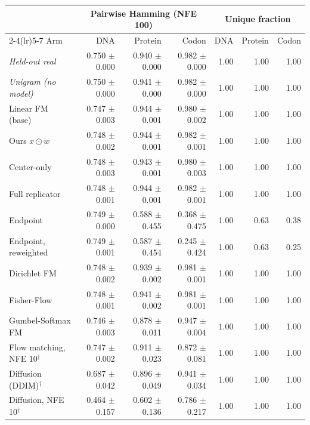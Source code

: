 \begin{tabular}{lrrrrrr}
\toprule
& \multicolumn{3}{c}{Pairwise Hamming (NFE 100)} & \multicolumn{3}{c}{Unique fraction} \\
\cmidrule(lr){2-4}\cmidrule(lr){5-7}
Arm & DNA & Protein & Codon & DNA & Protein & Codon \\
\midrule
\emph{Held-out real} & 0.750 $\pm$ 0.000 & 0.940 $\pm$ 0.000 & 0.982 $\pm$ 0.000 & 1.00 & 1.00 & 1.00 \\
\emph{Unigram (no model)} & 0.750 $\pm$ 0.000 & 0.941 $\pm$ 0.000 & 0.982 $\pm$ 0.000 & 1.00 & 1.00 & 1.00 \\
\midrule
Linear FM (base) & 0.747 $\pm$ 0.003 & 0.944 $\pm$ 0.001 & 0.980 $\pm$ 0.002 & 1.00 & 1.00 & 1.00 \\
Ours $x\odot w$ & 0.748 $\pm$ 0.002 & 0.944 $\pm$ 0.001 & 0.982 $\pm$ 0.001 & 1.00 & 1.00 & 1.00 \\
Center-only & 0.748 $\pm$ 0.003 & 0.943 $\pm$ 0.001 & 0.980 $\pm$ 0.003 & 1.00 & 1.00 & 1.00 \\
Full replicator & 0.748 $\pm$ 0.001 & 0.944 $\pm$ 0.001 & 0.982 $\pm$ 0.001 & 1.00 & 1.00 & 1.00 \\
Endpoint & 0.749 $\pm$ 0.000 & 0.588 $\pm$ 0.455 & 0.368 $\pm$ 0.475 & 1.00 & 0.63 & 0.38 \\
Endpoint, reweighted & 0.749 $\pm$ 0.001 & 0.587 $\pm$ 0.454 & 0.245 $\pm$ 0.424 & 1.00 & 0.63 & 0.25 \\
Dirichlet FM & 0.748 $\pm$ 0.002 & 0.939 $\pm$ 0.002 & 0.981 $\pm$ 0.001 & 1.00 & 1.00 & 1.00 \\
Fisher-Flow & 0.748 $\pm$ 0.001 & 0.941 $\pm$ 0.002 & 0.981 $\pm$ 0.001 & 1.00 & 1.00 & 1.00 \\
Gumbel-Softmax FM & 0.746 $\pm$ 0.003 & 0.878 $\pm$ 0.011 & 0.947 $\pm$ 0.004 & 1.00 & 1.00 & 1.00 \\
\midrule
Flow matching, NFE 10$^\dagger$ & 0.747 $\pm$ 0.002 & 0.911 $\pm$ 0.023 & 0.872 $\pm$ 0.081 & 1.00 & 1.00 & 1.00 \\
Diffusion (DDIM)$^\dagger$ & 0.687 $\pm$ 0.042 & 0.896 $\pm$ 0.049 & 0.941 $\pm$ 0.034 & 1.00 & 1.00 & 1.00 \\
Diffusion, NFE 10$^\dagger$ & 0.464 $\pm$ 0.157 & 0.602 $\pm$ 0.136 & 0.786 $\pm$ 0.217 & 1.00 & 1.00 & 1.00 \\
\bottomrule
\end{tabular}